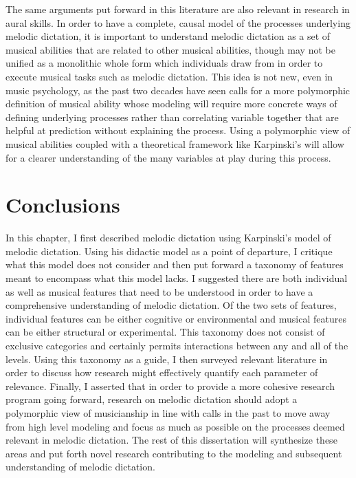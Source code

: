 \documentclass[12pt,]{book}
\begin{document}
The same arguments put forward in this literature are also relevant in research in aural skills.
In order to have a complete, causal model of the processes underlying melodic dictation, it is important to understand melodic dictation as a set of musical abilities that are related to other musical abilities, though may not be unified as a monolithic whole form which individuals draw from in order to execute musical tasks such as melodic dictation.
This idea is not new, even in music psychology, as the past two decades have seen calls for a more polymorphic definition of musical ability \citep{levitinWhatDoesIt2012, peretzModularityMusicProcessing2003} whose modeling will require more concrete ways of defining underlying processes rather than correlating variable together that are helpful at prediction without explaining the process.
Using a polymorphic view of musical abilities coupled with a theoretical framework like Karpinski's will allow for a clearer understanding of the many variables at play during this process.

\hypertarget{conclusions}{%
\section{Conclusions}\label{conclusions}}

In this chapter, I first described melodic dictation using Karpinski's model of melodic dictation.
Using his didactic model as a point of departure, I critique what this model does not consider and then put forward a taxonomy of features meant to encompass what this model lacks.
I suggested there are both individual as well as musical features that need to be understood in order to have a comprehensive understanding of melodic dictation.
Of the two sets of features, individual features can be either cognitive or environmental and musical features can be either structural or experimental.
This taxonomy does not consist of exclusive categories and certainly permits interactions between any and all of the levels.
Using this taxonomy as a guide, I then surveyed relevant literature in order to discuss how research might effectively quantify each parameter of relevance.
Finally, I asserted that in order to provide a more cohesive research program going forward, research on melodic dictation should adopt a polymorphic view of musicianship in line with calls in the past to move away from high level modeling and focus as much as possible on the processes deemed relevant in melodic dictation.
The rest of this dissertation will synthesize these areas and put forth novel research contributing to the modeling and subsequent understanding of melodic dictation.
\end{document}
